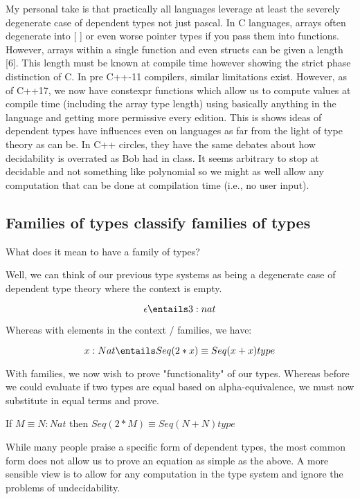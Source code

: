 \documentclass[11pt]{article}
\begin{document}
My personal take is that practically all languages leverage at least the severely degenerate case of dependent types not just pascal. In C languages, arrays often degenerate into [ ] or even worse pointer types if you pass them into functions. However, arrays within a single function and even structs can be given a length [6]. This length must be known at compile time however showing the strict phase distinction of C. In pre C++-11 compilers, similar limitations exist. However, as of C++17, we now have constexpr functions which allow us to compute values at compile time (including the array type length) using basically anything in the language and getting more permissive every edition. This is shows ideas of dependent types have influences even on languages as far from the light of type theory as can be. In C++ circles, they have the same debates about how decidability is overrated as Bob had in class. It seems arbitrary to stop at decidable and not something like polynomial so we might as well allow any computation that can be done at compilation time (i.e., no user input).

\subsection*{Families of types classify families of types}

What does it mean to have a family of types?

Well, we can think of our previous type systems as being a degenerate case of dependent type theory where the context is empty.

$$\epsilon \entails 3 : nat$$

Whereas with elements in the context / families, we have:

$$x : Nat \entails Seq(2 * x) \equiv Seq(x + x) type$$

With families, we now wish to prove "functionality" of our types. Whereas before we could evaluate if two types are equal based on alpha-equivalence, we must now substitute in equal terms and prove.

If $M \equiv N : Nat$ then $Seq(2 * M) \equiv Seq(N + N) type$

While many people praise a specific form of dependent types, the most common form does not allow us to prove an equation as simple as the above. A more sensible view is to allow for any computation in the type system and ignore the problems of undecidability.
\end{document}
